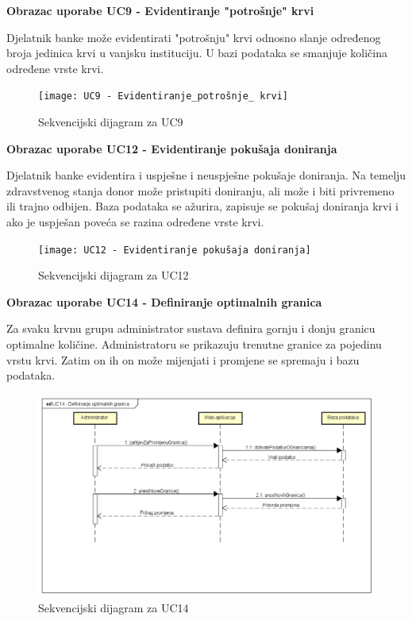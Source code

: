 \documentclass[11pt]{book}
\begin{document}
\textbf{Obrazac uporabe UC9 - Evidentiranje "potrošnje" krvi}

Djelatnik banke može evidentirati "potrošnju" krvi odnosno slanje određenog broja jedinica krvi u vanjsku instituciju. U bazi podataka se smanjuje količina određene vrste krvi.

\begin{figure}[h]
	\centering
	\texttt{[image: UC9 - Evidentiranje\_potrošnje\_ krvi]}
	\caption{Sekvencijski dijagram za UC9}
\end{figure}

\textbf{Obrazac uporabe UC12 - Evidentiranje pokušaja doniranja}

Djelatnik banke evidentira i uspješne i neuspješne pokušaje doniranja. Na temelju zdravstvenog stanja donor može pristupiti doniranju, ali može i biti privremeno ili trajno odbijen. Baza podataka se ažurira, zapisuje se pokušaj doniranja krvi i ako je uspješan poveća se razina određene vrste krvi.

\begin{figure}[h]
	\centering
	\texttt{[image: UC12 - Evidentiranje pokušaja doniranja]}
	\caption{Sekvencijski dijagram za UC12}
\end{figure}
\eject

\textbf{Obrazac uporabe UC14 - Definiranje optimalnih granica}

Za svaku krvnu grupu administrator sustava definira gornju i donju granicu optimalne količine. Administratoru se prikazuju trenutne granice za pojedinu vrstu krvi. Zatim on ih on može mijenjati i promjene se spremaju i bazu podataka.

\begin{figure}[h]
	\centering
	\includegraphics[width=\textwidth]{UC14 - Definiranje optimalnih granica}
	\caption{Sekvencijski dijagram za UC14}
\end{figure}
\eject
\end{document}
